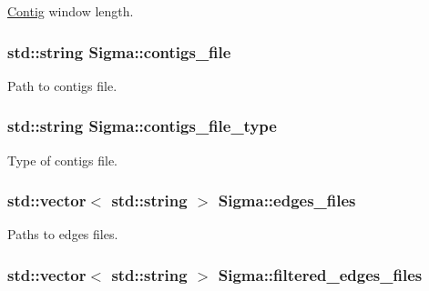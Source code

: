 \label{classSigma_a388ca75430d14e589b9e99933973b454}
\hyperlink{classContig}{Contig} window length. \hypertarget{classSigma_a2bb972d1c9db318b5616cf2dc211fbfa}{
\subsubsection[{contigs\_\-file}]{\setlength{\rightskip}{0pt plus 5cm}std::string {\bf Sigma::contigs\_\-file}}}
\label{classSigma_a2bb972d1c9db318b5616cf2dc211fbfa}
Path to contigs file. \hypertarget{classSigma_a27244771a8b20af2f27924fe3a6bedd6}{
\subsubsection[{contigs\_\-file\_\-type}]{\setlength{\rightskip}{0pt plus 5cm}std::string {\bf Sigma::contigs\_\-file\_\-type}}}
\label{classSigma_a27244771a8b20af2f27924fe3a6bedd6}
Type of contigs file. \hypertarget{classSigma_a30434aee9f491592a8e06c44c6e49844}{
\subsubsection[{edges\_\-files}]{\setlength{\rightskip}{0pt plus 5cm}std::vector$<$ std::string $>$ {\bf Sigma::edges\_\-files}}}
\label{classSigma_a30434aee9f491592a8e06c44c6e49844}
Paths to edges files. \hypertarget{classSigma_add16cab45b900fff34bedc48754facfc}{
\subsubsection[{filtered\_\-edges\_\-files}]{\setlength{\rightskip}{0pt plus 5cm}std::vector$<$ std::string $>$ {\bf Sigma::filtered\_\-edges\_\-files}}}
